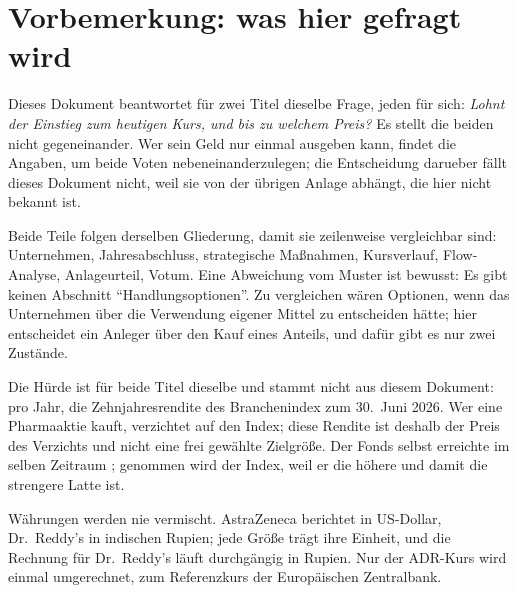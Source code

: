 \section*{Vorbemerkung: was hier gefragt wird}

Dieses Dokument beantwortet f\"ur zwei Titel dieselbe Frage, jeden f\"ur sich:
\emph{Lohnt der Einstieg zum heutigen Kurs, und bis zu welchem Preis?} Es
stellt die beiden nicht gegeneinander. Wer sein Geld nur einmal ausgeben kann,
findet die Angaben, um beide Voten nebeneinanderzulegen; die Entscheidung
darueber f\"allt dieses Dokument nicht, weil sie von der \"ubrigen Anlage
abh\"angt, die hier nicht bekannt ist.

Beide Teile folgen derselben Gliederung, damit sie zeilenweise vergleichbar
sind: Unternehmen, Jahresabschluss, strategische Ma{\ss}nahmen, Kursverlauf,
Flow-Analyse, Anlageurteil, Votum. Eine Abweichung vom Muster ist bewusst:
Es gibt keinen Abschnitt \enquote{Handlungsoptionen}. Zu vergleichen w\"aren
Optionen, wenn das Unternehmen \"uber die Verwendung eigener Mittel zu
entscheiden h\"atte; hier entscheidet ein Anleger \"uber den Kauf eines
Anteils, und daf\"ur gibt es nur zwei Zust\"ande.

Die H\"urde ist f\"ur beide Titel dieselbe und stammt nicht aus diesem
Dokument: \Pct{\Huerde} pro Jahr, die Zehnjahresrendite des Branchenindex zum
30.~Juni 2026.
Wer eine Pharmaaktie kauft, verzichtet auf den Index; diese Rendite ist
deshalb der Preis des Verzichts und nicht eine frei gew\"ahlte Zielgr\"o{\ss}e.
Der Fonds selbst erreichte im selben Zeitraum \Pct{\HuerdeFonds}; genommen
wird der Index, weil er die h\"ohere und damit die strengere Latte ist.

W\"ahrungen werden nie vermischt. AstraZeneca berichtet in US-Dollar,
Dr.~Reddy's in indischen Rupien; jede Gr\"o{\ss}e tr\"agt ihre Einheit, und
die Rechnung f\"ur Dr.~Reddy's l\"auft durchg\"angig in Rupien. Nur der
ADR-Kurs wird einmal umgerechnet, zum Referenzkurs der Europ\"aischen
Zentralbank.
